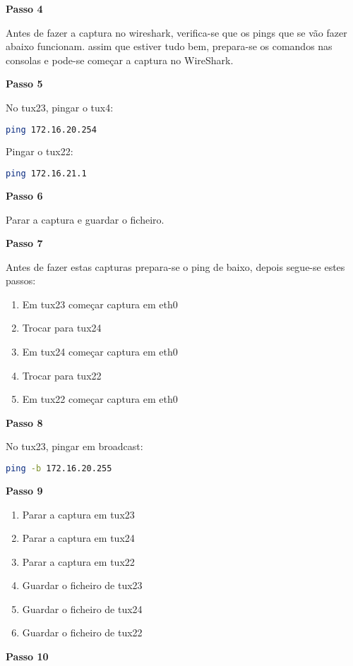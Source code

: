 \textbf{Passo 4}

Antes de fazer a captura no wireshark, verifica-se que os pings que se vão fazer abaixo funcionam. assim que estiver tudo bem, prepara-se os comandos nas consolas e pode-se começar a captura no WireShark.

\textbf{Passo 5}

No tux23, pingar o tux4:
\begin{lstlisting}[language=bash]
ping 172.16.20.254
\end{lstlisting}
Pingar o tux22:
\begin{lstlisting}[language=bash]
ping 172.16.21.1
\end{lstlisting}

\textbf{Passo 6}

Parar a captura e guardar o ficheiro.

\textbf{Passo 7}

Antes de fazer estas capturas prepara-se o ping de baixo, depois segue-se estes passos:

\begin{enumerate}
  \item Em tux23 começar captura em eth0
  \item Trocar para tux24
  \item Em tux24 começar captura em eth0
  \item Trocar para tux22
  \item Em tux22 começar captura em eth0
\end{enumerate}
  
\textbf{Passo 8}

No tux23, pingar em broadcast:
\begin{lstlisting}[language=bash]
ping -b 172.16.20.255
\end{lstlisting}

\textbf{Passo 9}

\begin{enumerate}
  \item Parar a captura em tux23
  \item Parar a captura em tux24
  \item Parar a captura em tux22
  \item Guardar o ficheiro de tux23
  \item Guardar o ficheiro de tux24
  \item Guardar o ficheiro de tux22
\end{enumerate}


\textbf{Passo 10}

